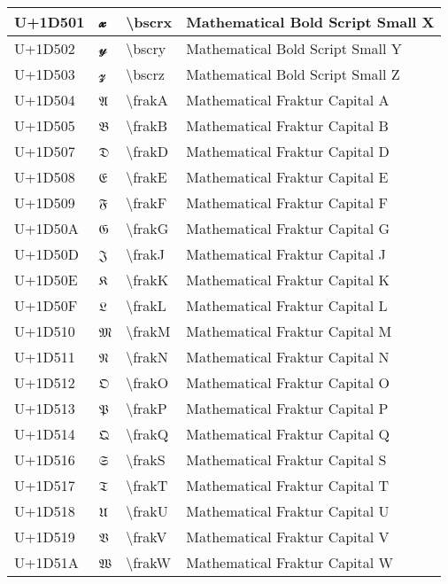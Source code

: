 \begin{table}[h]
\begin{tabulary}{\linewidth}{|L|L|L|L|}
\hline
U+1D501 & 𝔁 & {\textbackslash}bscrx & Mathematical Bold Script Small X \\
\hline
U+1D502 & 𝔂 & {\textbackslash}bscry & Mathematical Bold Script Small Y \\
\hline
U+1D503 & 𝔃 & {\textbackslash}bscrz & Mathematical Bold Script Small Z \\
\hline
U+1D504 & 𝔄 & {\textbackslash}frakA & Mathematical Fraktur Capital A \\
\hline
U+1D505 & 𝔅 & {\textbackslash}frakB & Mathematical Fraktur Capital B \\
\hline
U+1D507 & 𝔇 & {\textbackslash}frakD & Mathematical Fraktur Capital D \\
\hline
U+1D508 & 𝔈 & {\textbackslash}frakE & Mathematical Fraktur Capital E \\
\hline
U+1D509 & 𝔉 & {\textbackslash}frakF & Mathematical Fraktur Capital F \\
\hline
U+1D50A & 𝔊 & {\textbackslash}frakG & Mathematical Fraktur Capital G \\
\hline
U+1D50D & 𝔍 & {\textbackslash}frakJ & Mathematical Fraktur Capital J \\
\hline
U+1D50E & 𝔎 & {\textbackslash}frakK & Mathematical Fraktur Capital K \\
\hline
U+1D50F & 𝔏 & {\textbackslash}frakL & Mathematical Fraktur Capital L \\
\hline
U+1D510 & 𝔐 & {\textbackslash}frakM & Mathematical Fraktur Capital M \\
\hline
U+1D511 & 𝔑 & {\textbackslash}frakN & Mathematical Fraktur Capital N \\
\hline
U+1D512 & 𝔒 & {\textbackslash}frakO & Mathematical Fraktur Capital O \\
\hline
U+1D513 & 𝔓 & {\textbackslash}frakP & Mathematical Fraktur Capital P \\
\hline
U+1D514 & 𝔔 & {\textbackslash}frakQ & Mathematical Fraktur Capital Q \\
\hline
U+1D516 & 𝔖 & {\textbackslash}frakS & Mathematical Fraktur Capital S \\
\hline
U+1D517 & 𝔗 & {\textbackslash}frakT & Mathematical Fraktur Capital T \\
\hline
U+1D518 & 𝔘 & {\textbackslash}frakU & Mathematical Fraktur Capital U \\
\hline
U+1D519 & 𝔙 & {\textbackslash}frakV & Mathematical Fraktur Capital V \\
\hline
U+1D51A & 𝔚 & {\textbackslash}frakW & Mathematical Fraktur Capital W \\

\end{tabulary}
\end{table}
